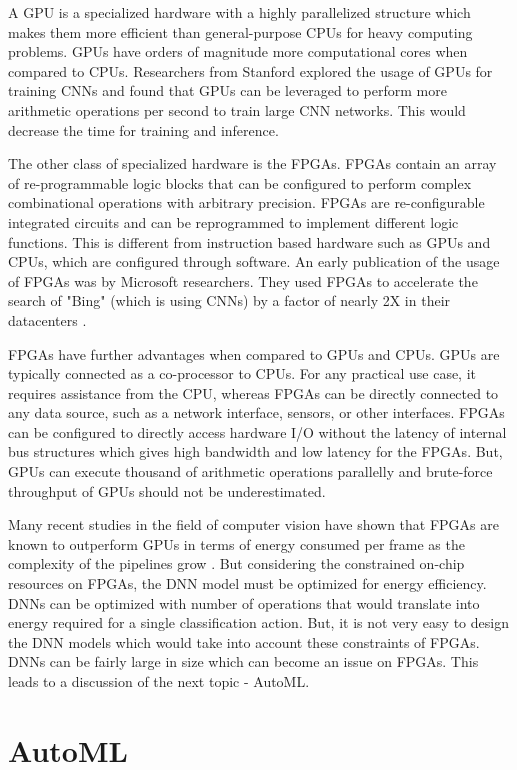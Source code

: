 A GPU is a specialized hardware with a highly parallelized structure which makes them more efficient than general-purpose CPUs for heavy computing problems. GPUs have orders of magnitude more computational cores when compared to CPUs. Researchers from Stanford explored the usage of GPUs for training CNNs \cite{coates2013deep} and found that GPUs can be leveraged to perform more arithmetic operations per second to train large CNN networks. This would decrease the time for training and inference.

The other class of specialized hardware is the FPGAs. FPGAs contain an array of re-programmable logic blocks that can be configured to perform complex combinational operations with arbitrary precision. FPGAs are re-configurable integrated circuits and can be reprogrammed to implement different logic functions. This is different from instruction based hardware such as GPUs and CPUs, which are configured through software. An early publication of the usage of FPGAs was by Microsoft researchers. They used FPGAs to accelerate the search of "Bing" (which is using CNNs) by a factor of nearly 2X in their datacenters \cite{ovtcharov2015accelerating}.

FPGAs have further advantages when compared to GPUs and CPUs. GPUs are typically connected as a co-processor to CPUs. For any practical use case, it requires assistance from the CPU, whereas FPGAs can be directly connected to any data source, such as a network interface, sensors, or other interfaces. FPGAs can be configured to directly access hardware I/O without the latency of internal bus structures which gives high bandwidth and low latency for the FPGAs. But, GPUs can execute thousand of arithmetic operations parallelly and brute-force throughput of GPUs should not be underestimated. 

Many recent studies in the field of computer vision have shown that FPGAs are known to outperform GPUs in terms of energy consumed per frame as the complexity of the pipelines grow \cite{qasaimeh2019comparing}. But considering the constrained on-chip resources on FPGAs, the DNN model must be optimized for energy efficiency. DNNs can be optimized with number of operations that would translate into energy required for a single classification action. But, it is not very easy to design the DNN models which would take into account these constraints of FPGAs. DNNs can be fairly large in size which can become an issue on FPGAs. This leads to a discussion of the next topic - AutoML.

\section{AutoML}

